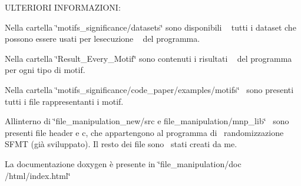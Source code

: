 \doxysubparagraph*{}

U\+L\+T\+E\+R\+I\+O\+RI I\+N\+F\+O\+R\+M\+A\+Z\+I\+O\+NI\+: ~\newline

\begin{DoxyItemize}
\item Nella cartella \char`\"{}motifs\+\_\+significance/datasets\char`\"{} sono disponibili ~\newline
 tutti i dataset che possono essere usati per l\textquotesingle{}esecuzione ~\newline
 del programma. ~\newline

\item Nella cartella \char`\"{}\+Result\+\_\+\+Every\+\_\+\+Motif\char`\"{} sono contenuti i risultati ~\newline
 del programma per ogni tipo di motif.~\newline

\item Nella cartella \char`\"{}motifs\+\_\+significance/code\+\_\+paper/examples/motifs\char`\"{}~\newline
 sono presenti tutti i file rappresentanti i motif.~\newline

\item All\textquotesingle{}interno di \char`\"{}file\+\_\+manipulation\+\_\+new/src e file\+\_\+manipulation/mnp\+\_\+lib\char`\"{}~\newline
 sono presenti file header e c, che appartengono al programma di~\newline
 randomizzazione S\+F\+MT (già sviluppato). Il resto dei file sono~\newline
 stati creati da me.~\newline

\item La documentazione doxygen è presente in \char`\"{}file\+\_\+manipulation/doc
  /html/index.\+html\char`\"{}~\newline

\end{DoxyItemize}